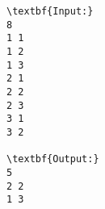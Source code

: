 \begin{verbatim}
\textbf{Input:}
8
1 1
1 2
1 3
2 1
2 2
2 3
3 1
3 2

\textbf{Output:}
5
2 2
1 3

\end{verbatim}